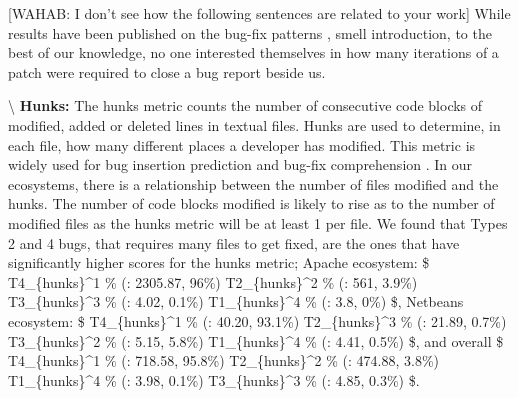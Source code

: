 {[}WAHAB: I don't see how the following sentences are related to your
work{]} While results have been published on the bug-fix patterns
\cite{Pan2008}, smell introduction\cite{Tufano2015, Eyolfson2011}, to
the best of our knowledge, no one interested themselves in how many
iterations of a patch were required to close a bug report beside us.

\textbackslash{} \vspace{0.1cm} {\bf Hunks: } The hunks metric counts
the number of consecutive code blocks of modified, added or deleted
lines in textual files. Hunks are used to determine, in each file, how
many different places a developer has modified. This metric is widely
used for bug insertion prediction \cite{Kim2006,Jung2009, Rosen2015} and
bug-fix comprehension \cite{Pan2008}. In our ecosystems, there is a
relationship between the number of files modified and the hunks. The
number of code blocks modified is likely to rise as to the number of
modified files as the hunks metric will be at least 1 per file. We found
that Types 2 and 4 bugs, that requires many files to get fixed, are the
ones that have significantly higher scores for the hunks metric; Apache
ecosystem: \$ T4\_\{hunks\}\^{}1 \% (\mu: 2305.87, 96\%) \gg
T2\_\{hunks\}\^{}2 \% (\mu: 561, 3.9\%) \gg
T3\_\{hunks\}\^{}3 \% (\mu: 4.02, 0.1\%) \gg
T1\_\{hunks\}\^{}4 \% (\mu: 3.8, 0\%) \$, Netbeans ecosystem: \$
T4\_\{hunks\}\^{}1 \% (\mu: 40.20, 93.1\%) \gg
T2\_\{hunks\}\^{}3 \% (\mu: 21.89, 0.7\%) \gg
T3\_\{hunks\}\^{}2 \% (\mu: 5.15, 5.8\%) \gg
T1\_\{hunks\}\^{}4 \% (\mu: 4.41, 0.5\%) \$, and overall \$
T4\_\{hunks\}\^{}1 \% (\mu: 718.58, 95.8\%) \gg
T2\_\{hunks\}\^{}2 \% (\mu: 474.88, 3.8\%) \gg
T1\_\{hunks\}\^{}4 \% (\mu: 3.98, 0.1\%) \gg
T3\_\{hunks\}\^{}3 \% (\mu: 4.85, 0.3\%) \$.

